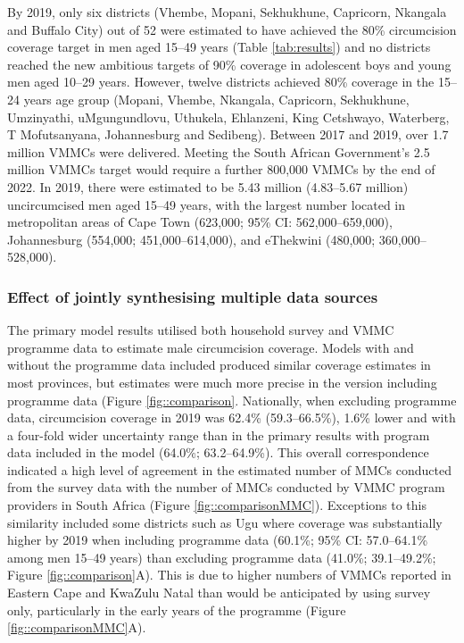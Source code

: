 \documentclass{article}
\begin{document}
By 2019, only six districts (Vhembe, Mopani, Sekhukhune, Capricorn, Nkangala and Buffalo City) out of 52 were estimated to have achieved the 80\% circumcision coverage target in men aged 15--49 years (Table \ref{tab:results}) and no districts reached the new ambitious targets of 90\% coverage in adolescent boys and young men aged 10--29 years. However, twelve districts achieved 80\% coverage in the 15--24 years age group (Mopani, Vhembe, Nkangala, Capricorn, Sekhukhune, Umzinyathi, uMgungundlovu, Uthukela, Ehlanzeni, King Cetshwayo, Waterberg, T Mofutsanyana, Johannesburg and Sedibeng). Between 2017 and 2019, over 1.7 million VMMCs were delivered. Meeting the South African Government's 2.5 million VMMCs target would require a further 800,000 VMMCs by the end of 2022. In 2019, there were estimated to be 5.43 million (4.83--5.67 million) uncircumcised men aged 15--49 years, with the largest number located in metropolitan areas of Cape Town (623,000; 95\% CI: 562,000--659,000), Johannesburg (554,000; 451,000--614,000), and eThekwini (480,000; 360,000--528,000).


\subsubsection*{Effect of jointly synthesising multiple data sources}



The primary model results utilised both household survey and VMMC programme data to estimate male circumcision coverage. Models with and without the programme data included produced similar coverage estimates in most provinces, but estimates were much more precise in the version including programme data  (Figure \ref{fig::comparison}. Nationally, when excluding programme data, circumcision coverage in 2019 was 62.4\% (59.3--66.5\%), 1.6\% lower and with a four-fold wider uncertainty range than in the primary results with program data included in the model (64.0\%; 63.2--64.9\%). This overall correspondence indicated a high level of agreement in the estimated number of MMCs conducted from the survey data with the number of MMCs conducted by VMMC program providers in South Africa (Figure \ref{fig::comparisonMMC}). Exceptions to this similarity included some districts such as Ugu where coverage was substantially higher by 2019 when including programme data (60.1\%; 95\% CI: 57.0--64.1\% among men 15--49 years) than excluding programme data (41.0\%; 39.1--49.2\%; Figure \ref{fig::comparison}A). This is due to higher numbers of VMMCs reported in Eastern Cape and KwaZulu Natal than would be anticipated by using survey only, particularly in the early years of the programme (Figure \ref{fig::comparisonMMC}A). 
\end{document}
